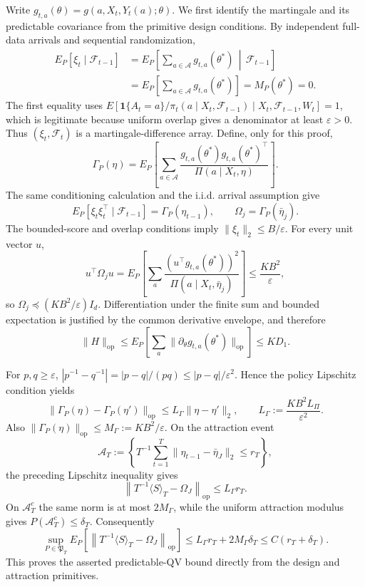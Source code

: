 Write \(g_{t,a}(\theta)=g(a,X_t,Y_t(a);\theta)\). We first identify the martingale and its predictable covariance from the primitive design conditions. By independent full-data arrivals and sequential randomization,
\[
\begin{aligned}
E_P[\xi_t\mid\mathcal F_{t-1}]
&=E_P\!\left[\sum_{a\in\mathcal A}g_{t,a}(\theta^*)\,\middle|\,\mathcal F_{t-1}\right]\\
&=E_P\!\left[\sum_{a\in\mathcal A}g_{t,a}(\theta^*)\right]
=M_P(\theta^*)=0.
\end{aligned}
\]
The first equality uses \(E[\mathbf 1\{A_t=a\}/\pi_t(a\mid X_t,\mathcal F_{t-1})\mid X_t,\mathcal F_{t-1},W_t]=1\), which is legitimate because uniform overlap gives a denominator at least \(\varepsilon>0\). Thus \((\xi_t,\mathcal F_t)\) is a martingale-difference array. Define, only for this proof,
\[
 \Gamma_P(\eta)=E_P\!\left[\sum_{a\in\mathcal A}
 \frac{g_{t,a}(\theta^*)g_{t,a}(\theta^*)^\top}{\Pi(a\mid X_t,\eta)}\right].
\]
The same conditioning calculation and the i.i.d. arrival assumption give
\[
 E_P[\xi_t\xi_t^\top\mid\mathcal F_{t-1}]=\Gamma_P(\eta_{t-1}),
 \qquad \Omega_j=\Gamma_P(\bar\eta_j).
\]
The bounded-score and overlap conditions imply \(\|\xi_t\|_2\le B/\varepsilon\). For every unit vector \(u\),
\[
 u^\top\Omega_ju
 =E_P\!\left[\sum_a\frac{(u^\top g_{t,a}(\theta^*))^2}{\Pi(a\mid X_t,\bar\eta_j)}\right]
 \le \frac{KB^2}{\varepsilon},
\]
so \(\Omega_j\preceq(KB^2/\varepsilon)I_d\). Differentiation under the finite sum and bounded expectation is justified by the common derivative envelope, and therefore
\[
 \|H\|_{\mathrm{op}}
 \le E_P\!\left[\sum_a\|\partial_\theta g_{t,a}(\theta^*)\|_{\mathrm{op}}\right]
 \le KD_1.
\]

For \(p,q\ge\varepsilon\), \(|p^{-1}-q^{-1}|=|p-q|/(pq)\le |p-q|/\varepsilon^2\). Hence the policy Lipschitz condition yields
\[
 \|\Gamma_P(\eta)-\Gamma_P(\eta')\|_{\mathrm{op}}
 \le L_\Gamma\|\eta-\eta'\|_2,
 \qquad L_\Gamma:=\frac{KB^2L_\Pi}{\varepsilon^2}.
\]
Also \(\|\Gamma_P(\eta)\|_{\mathrm{op}}\le M_\Gamma:=KB^2/\varepsilon\). On the attraction event
\[
 \mathcal A_T:=\left\{T^{-1}\sum_{t=1}^T\|\eta_{t-1}-\bar\eta_J\|_2\le r_T\right\},
\]
the preceding Lipschitz inequality gives
\[
 \left\|T^{-1}\langle S\rangle_T-\Omega_J\right\|_{\mathrm{op}}
 \le L_\Gamma r_T.
\]
On \(\mathcal A_T^c\) the same norm is at most \(2M_\Gamma\), while the uniform attraction modulus gives \(P(\mathcal A_T^c)\le\delta_T\). Consequently
\[
 \sup_{P\in\mathfrak P_T}E_P\left[\left\|T^{-1}\langle S\rangle_T-\Omega_J\right\|_{\mathrm{op}}\right]
 \le L_\Gamma r_T+2M_\Gamma\delta_T
 \le C(r_T+\delta_T).
\]
This proves the asserted predictable-QV bound directly from the design and attraction primitives.


